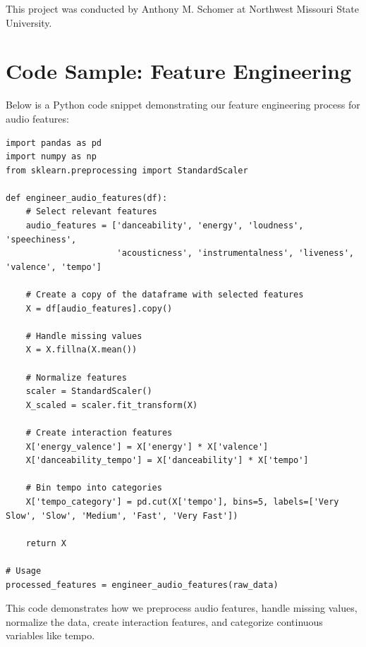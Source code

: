 \documentclass[runningheads]{llncs}
\begin{document}
\vspace{1em}
This project was conducted by Anthony M. Schomer at Northwest Missouri State University.

\appendix
\section{Code Sample: Feature Engineering}

Below is a Python code snippet demonstrating our feature engineering process for audio features:

\begin{verbatim}
import pandas as pd
import numpy as np
from sklearn.preprocessing import StandardScaler

def engineer_audio_features(df):
    # Select relevant features
    audio_features = ['danceability', 'energy', 'loudness', 'speechiness', 
                      'acousticness', 'instrumentalness', 'liveness', 'valence', 'tempo']
    
    # Create a copy of the dataframe with selected features
    X = df[audio_features].copy()
    
    # Handle missing values
    X = X.fillna(X.mean())
    
    # Normalize features
    scaler = StandardScaler()
    X_scaled = scaler.fit_transform(X)
    
    # Create interaction features
    X['energy_valence'] = X['energy'] * X['valence']
    X['danceability_tempo'] = X['danceability'] * X['tempo']
    
    # Bin tempo into categories
    X['tempo_category'] = pd.cut(X['tempo'], bins=5, labels=['Very Slow', 'Slow', 'Medium', 'Fast', 'Very Fast'])
    
    return X

# Usage
processed_features = engineer_audio_features(raw_data)
\end{verbatim}

This code demonstrates how we preprocess audio features, handle missing values, normalize the data, create interaction features, and categorize continuous variables like tempo.
\end{document}
